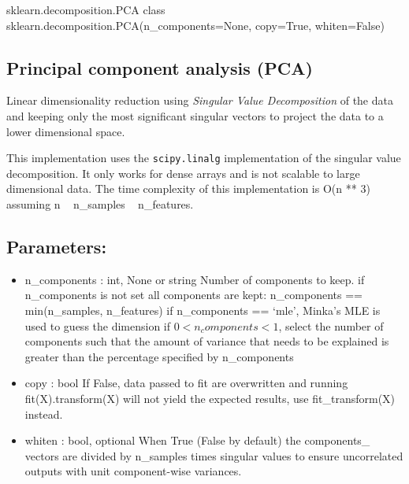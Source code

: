 sklearn.decomposition.PCA
class sklearn.decomposition.PCA(n_components=None, copy=True, whiten=False)
\subsection*{Principal component analysis (PCA)}

Linear dimensionality reduction using \textit{Singular Value Decomposition} of the data and keeping only the most significant singular vectors to project the data to a lower dimensional space.

This implementation uses the \texttt{scipy.linalg} implementation of the singular value decomposition. It only works for dense arrays and is not scalable to large dimensional data.
The time complexity of this implementation is O(n ** 3) assuming n ~ n_samples ~ n_features.

\subsection*{Parameters:}	
\begin{itemize}
\item n\_components : int, None or string
Number of components to keep. if n_components is not set all components are kept:
n_components == min(n_samples, n_features)
if n_components == ‘mle’, Minka’s MLE is used to guess the dimension if $0 < n_components < 1$, select the number of components such that the amount of variance that needs to be explained is greater than the percentage specified by n_components
\item copy : bool
If False, data passed to fit are overwritten and running fit(X).transform(X) will not yield the expected results, use fit_transform(X) instead.
\item whiten : bool, optional
When True (False by default) the components_ vectors are divided by n_samples times singular values to ensure uncorrelated outputs with unit component-wise variances.
\end{itemize}

